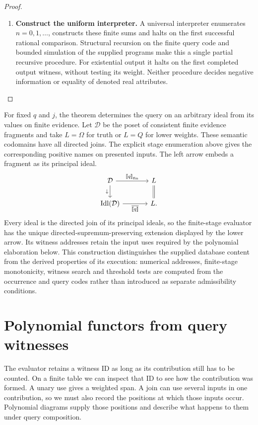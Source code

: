 \documentclass[11pt,a4paper]{article}
\theoremstyle{definition}
\theoremstyle{remark}\newaliascnt{remark}{theorem}
\providecommand{\llbracket}{\mathopen{[\mkern-3mu[}}
\providecommand{\rrbracket}{\mathclose{]\mkern-3mu]}}
\newcommand{\Idl}{\operatorname{Idl}}
\numberwithin{equation}{section}
\begin{document}
\begin{proof}
\begin{enumerate}[titledsteps]
    \item \textbf{Construct the uniform interpreter.} A universal interpreter enumerates $n=0,1,\ldots$, constructs these finite sums and halts on the first successful rational comparison. Structural recursion on the finite query code and bounded simulation of the supplied programs make this a single partial recursive procedure. For existential output it halts on the first completed output witness, without testing its weight. Neither procedure decides negative information or equality of denoted real attributes.\qedhere
\end{enumerate}
\end{proof}

For fixed $q$ and $j$, the theorem determines the query on an arbitrary ideal from its values on finite evidence. Let $\mathcal D$ be the poset of consistent finite evidence fragments and take $L=\Omega$ for truth or $L=Q$ for lower weights. These semantic codomains have all directed joins. The explicit stage enumeration above gives the corresponding positive names on presented inputs. The left arrow embeds a fragment as its principal ideal.
\[
\begin{tikzcd}[column sep=large]
 \mathcal D \arrow[r,"{\llbracket q\rrbracket_{\rm fin}}"] \arrow[d,"\downarrow"']&
 L \arrow[d,equal]\\
 \Idl(\mathcal D) \arrow[r,"{\overline{\llbracket q\rrbracket}}"']& L .
\end{tikzcd}
\]
Every ideal is the directed join of its principal ideals, so the finite-stage evaluator has the unique directed-supremum-preserving extension displayed by the lower arrow. Its witness addresses retain the input uses required by the polynomial elaboration below. This construction distinguishes the supplied database content from the derived properties of its execution: numerical addresses, finite-stage monotonicity, witness search and threshold tests are computed from the occurrence and query codes rather than introduced as separate admissibility conditions.

\section{Polynomial functors from query witnesses}\label{sec:witness}

The evaluator retains a witness ID as long as its contribution still has to be counted. On a finite table we can inspect that ID to see how the contribution was formed. A unary use gives a weighted span. A join can use several inputs in one contribution, so we must also record the positions at which those inputs occur. Polynomial diagrams supply those positions and describe what happens to them under query composition.
\end{document}
